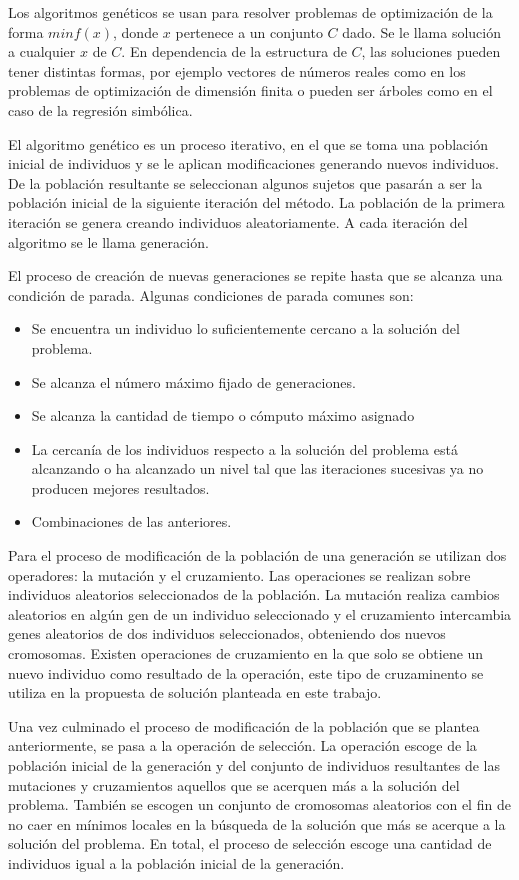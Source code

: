 Los algoritmos genéticos se usan para resolver problemas de optimización de la forma $min f(x)$, donde $x$ pertenece a un conjunto $C$ dado. Se le llama solución a cualquier $x$ de $C$. En dependencia de la estructura de $C$, las soluciones pueden tener distintas formas, por ejemplo vectores de números reales como en los problemas de optimización de dimensión finita o pueden ser árboles como en el caso de la regresión simbólica.

El algoritmo genético es un proceso iterativo, en el que se toma una población inicial de individuos y se le aplican modificaciones generando nuevos individuos. De la población resultante se seleccionan algunos sujetos que pasarán a ser la población inicial de la siguiente iteración del método. La población de la primera iteración se genera creando individuos aleatoriamente. A cada iteración del algoritmo se le llama generación.

El proceso de creación de nuevas generaciones se repite hasta que se alcanza una condición de parada. Algunas condiciones de parada comunes son:

\begin{itemize}
    \item Se encuentra un individuo lo suficientemente cercano a la solución del problema.
    \item Se alcanza el número máximo fijado de generaciones.
    \item Se alcanza la cantidad de tiempo o cómputo máximo asignado
    \item La cercanía de los individuos respecto a la solución del problema está alcanzando o ha alcanzado un nivel tal que las iteraciones sucesivas ya no producen mejores resultados.
    \item Combinaciones de las anteriores.
\end{itemize}

Para el proceso de modificación de la población de una generación se utilizan dos operadores: la mutación y el cruzamiento. Las operaciones se realizan sobre individuos aleatorios seleccionados de la población. La mutación realiza cambios aleatorios en algún gen de un individuo seleccionado y el cruzamiento intercambia genes aleatorios de dos individuos seleccionados, obteniendo dos nuevos cromosomas. Existen operaciones de cruzamiento en la que solo se obtiene un nuevo individuo como resultado de la operación, este tipo de cruzaminento se utiliza en la propuesta de solución planteada en este trabajo.

Una vez culminado el proceso de modificación de la población que se plantea anteriormente, se pasa a la operación de selección. La operación escoge de la población inicial de la generación y del conjunto de individuos resultantes de las mutaciones y cruzamientos aquellos que se acerquen más a la solución del problema. También se escogen un conjunto de cromosomas aleatorios con el fin de no caer en mínimos locales en la búsqueda de la solución que más se acerque a la solución del problema. En total, el proceso de selección escoge una cantidad de individuos igual a la población inicial de la generación.

